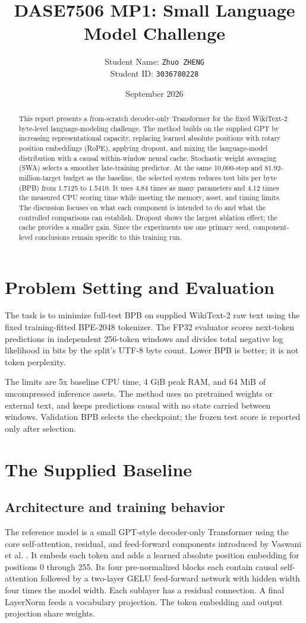 \documentclass[11pt]{article}
\title{DASE7506 MP1: Small Language Model Challenge}
\author{Student Name: \texttt{Zhuo ZHENG}\\Student ID: \texttt{3036780228}}
\date{September 2026}
\begin{document}
\maketitle

\begin{abstract}
This report presents a from-scratch decoder-only Transformer for the fixed WikiText-2 byte-level language-modeling challenge. The method builds on the supplied GPT by increasing representational capacity, replacing learned absolute positions with rotary position embeddings (RoPE), applying dropout, and mixing the language-model distribution with a causal within-window neural cache. Stochastic weight averaging (SWA) selects a smoother late-training predictor. At the same 10,000-step and 81.92-million-target budget as the baseline, the selected system reduces test bits per byte (BPB) from 1.7125 to 1.5410. It uses 4.84 times as many parameters and 4.12 times the measured CPU scoring time while meeting the memory, asset, and timing limits. The discussion focuses on what each component is intended to do and what the controlled comparisons can establish. Dropout shows the largest ablation effect; the cache provides a smaller gain. Since the experiments use one primary seed, component-level conclusions remain specific to this training run.
\end{abstract}

\section{Problem Setting and Evaluation}
The task is to minimize full-test BPB on supplied WikiText-2 raw text using the fixed training-fitted BPE-2048 tokenizer. The FP32 evaluator scores next-token predictions in independent 256-token windows and divides total negative log likelihood in bits by the split's UTF-8 byte count. Lower BPB is better; it is not token perplexity.

The limits are 5x baseline CPU time, 4 GiB peak RAM, and 64 MiB of uncompressed inference assets. The method uses no pretrained weights or external text, and keeps predictions causal with no state carried between windows. Validation BPB selects the checkpoint; the frozen test score is reported only after selection.

\section{The Supplied Baseline}
\subsection{Architecture and training behavior}
The reference model is a small GPT-style decoder-only Transformer using the core self-attention, residual, and feed-forward components introduced by Vaswani et al. \cite{vaswani2017attention}. It embeds each token and adds a learned absolute position embedding for positions 0 through 255. Its four pre-normalized blocks each contain causal self-attention followed by a two-layer GELU feed-forward network with hidden width four times the model width. Each sublayer has a residual connection. A final LayerNorm feeds a vocabulary projection. The token embedding and output projection share weights.
\end{document}
